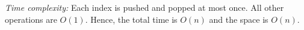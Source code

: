 \documentclass[12pt, letterpaper]{article}
\begin{document}
\begin{enumerate}
\textit{Time complexity:}  
Each index is pushed and popped at most once. All other operations are $O(1)$. Hence, the total time is $O(n)$ and the space is $O(n)$. 

\end{enumerate}
\end{document}

